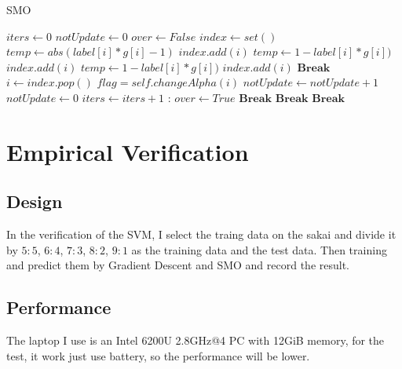 \documentclass[conference,compsoc]{IEEEtran}
\begin{document}
			\begin{algorithm}
				\caption{SMO}
				\begin{algorithmic}[1]
						\State $iters\gets 0$
						\State $notUpdate\gets 0$
						\State $over\gets False$
							\State $index\gets set()$
									\State $temp\gets abs(label[i]*g[i]-1)$
										\State $index.add(i)$
									\EndIf
								\EndIf
							\EndFor
										\State $temp\gets 1-label[i]*g[i])$
											\State $index.add(i)$
										\EndIf
										\State $temp\gets 1-label[i]*g[i])$
											\State $index.add(i)$
										\EndIf
									\EndIf
								\EndFor
							\EndIf
								\State $\bm{Break}$
							\EndIf
								\State $i\gets index.pop()$
								\State $flag = self.changeAlpha(i)$
									\State $notUpdate\gets notUpdate+1$
								\Else
									\State $notUpdate\gets 0$
									\State $iters\gets iters+1$
								\EndIf
								:
									\State $over\gets True$
									\State $\bm{Break}$
								\EndIf
									\State $\bm{Break}$
								\EndIf
							\EndWhile
								\State $\bm{Break}$
							\EndIf
						\EndWhile
					\EndFunction
				\end{algorithmic}
			\end{algorithm}

\section{Empirical Verification}
  \subsection{Design}
   In the verification of the SVM, I select the traing data on the sakai and divide it by $5:5$, $6:4$, $7:3$, $8:2$, $9:1$ as the training data and the test data.
   Then training and predict them by Gradient Descent and SMO and record the result.
  \subsection{Performance}
	The laptop I use is an Intel 6200U 2.8GHz@4 PC with 12GiB memory, for the test, it work just use battery, so the performance will be lower. 
\end{document}
